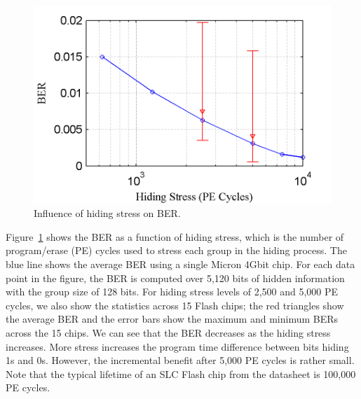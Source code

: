 \begin{figure} 
\begin{center} 
\includegraphics[width=\mywidth]{figs/accuracy.png} 
\caption{Influence of hiding stress on BER.}
\label{fig:BER_vs_stress} 
\vspace{-0.1in}

\end{center} 
\end{figure}


Figure~\ref{fig:BER_vs_stress} shows the BER as a function of 
hiding stress, which is the number of program/erase (PE) cycles used
to stress each group in the hiding process. 
The blue line shows the average BER using a single Micron 4Gbit chip.
For each data point in the figure, the BER is computed over 5,120 
bits of hidden information with the group size of 128 bits.
For hiding stress levels of 2,500 and 5,000 PE cycles, we also show
the statistics across 15 Flash chips; the red triangles show the 
average BER and the error bars show the maximum and minimum BERs across 
the 15 chips. We can see that the BER decreases as the hiding stress 
increases. More stress increases the program time difference between
bits hiding 1s and 0s. However, the incremental benefit after 
5,000 PE cycles is rather small. Note that the typical lifetime
of an SLC Flash chip from the datasheet is 100,000 PE cycles. 


